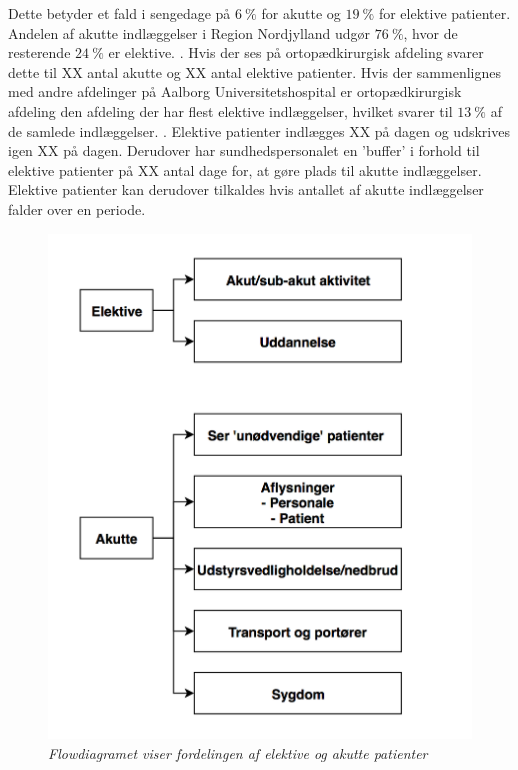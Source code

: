  Dette betyder et fald i sengedage på $6~\%$ for akutte og $19~\%$ for elektive patienter. Andelen af akutte indlæggelser i Region Nordjylland udgør $76~\%$, hvor de resterende $24~\%$ er elektive. \cite{RegionNord2016}. Hvis der ses på ortopædkirurgisk afdeling svarer dette til XX antal akutte og XX antal elektive patienter. Hvis der sammenlignes med andre afdelinger på Aalborg Universitetshospital er ortopædkirurgisk afdeling den afdeling der har flest elektive indlæggelser, hvilket svarer til $13~\%$ af de samlede indlæggelser. \cite{RegionNord2016}. Elektive patienter indlægges XX på dagen og udskrives igen XX på dagen. Derudover har sundhedspersonalet en 'buffer' i forhold til elektive patienter på XX antal dage for, at gøre plads til akutte indlæggelser. Elektive patienter kan derudover tilkaldes hvis antallet af akutte indlæggelser falder over en periode. 

\begin{figure}[H]
	\flushleft 
	\centering
	\includegraphics[scale=.45]{figures/planlagtakutte.png}
	\label{planlagtakutte}
	\flushleft
	\textit{Flowdiagramet viser fordelingen af elektive og akutte patienter\cite{Company2013}}
\end{figure}